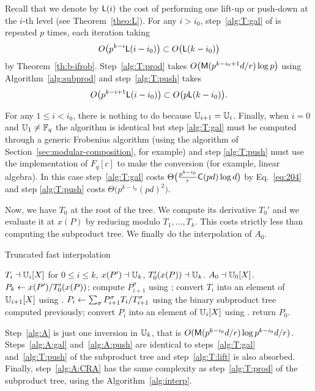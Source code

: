 Recall that we denote by $\mathsf{L}(i)$ the cost of performing one lift-up
or push-down at the $i$-th level (see Theorem~\ref{theo:L}). For any
$i>i_0$, step~\ref{alg:T:gal} of is repeated $p$ times, each iteration
taking 
\[O\bigl(p^{k-i}\mathsf{L}(i-i_0)\bigr) \subset O\bigl(\mathsf{L}(k-i_0)\bigr)\]
by Theorem~\ref{th:b-ifrob}.  Step~\ref{alg:T:prod} takes
$O\bigl(\mathsf{M}(p^{k-i_0+1}d/r)\log p\bigr)$ using
Algorithm~\ref{alg:subprod} and step~\ref{alg:T:push} takes
\[O\bigl(p^{k-i+1}\mathsf{L}(i-i_0)\bigr) \subset
O\bigl(p\mathsf{L}(k-i_0)\bigr)\text{.}\]

For any $1\le i<i_0$, there is nothing to do because
$\mathbb{U}_{i+1}=\mathbb{U}_i$. Finally, when $i=0$ and $\mathbb{U}_1\ne\mathbb{F}_q$ the algorithm
is identical but step \ref{alg:T:gal} must be computed through a
generic Frobenius algorithm (using the algorithm of
Section~\ref{sec:modular-composition}, for example) and step
\ref{alg:T:push} must use the implementation of $F_q[c]$ to make the
conversion (for example, linear algebra). In this case
step~\ref{alg:T:gal} costs
$\Theta\bigl(\frac{p^{k-i_0}}{r}\mathsf{C}(pd)\log d \bigr)$
by Eq.~\eqref{eq:204} and step \ref{alg:T:push} costs
$\Theta\bigl(p^{k-i_0}(pd)^2\bigr)$.

Now, we have $T_0$ at the root of the tree. We compute its derivative
$T_0'$ and we evaluate it at $x(P)$ by reducing modulo
$T_1,\ldots,T_k$. This costs strictly less than computing the
subproduct tree.  We finally do the interpolation of $A_0$.

\begin{algorithm}
  \caption{Truncated fast interpolation}
  \begin{algorithmic}[1]
    \REQUIRE $T_i\dashv\mathbb{U}_i[X]$ for $0\le i\le k$, $x(P')\dashv\mathbb{U}_k$, $T_0'(x(P))\dashv\mathbb{U}_k$.
    \ENSURE $A_0\dashv\mathbb{U}_0[X]$.
    \STATE\label{alg:A}  $P_k \leftarrow x(P')/T_0'(x(P))$;
    \STATE\label{alg:A:gal} compute $P_{i+1}^\sigma$ using ;
    \ENDFOR
    \STATE\label{alg:T:lift} convert $T_i$ into an element of $\mathbb{U}_{i+1}[X]$ using .
    \STATE\label{alg:A:CRA} $P_i\leftarrow \sum_{\sigma}P_{i+1}^\sigma T_i/T_{i+1}^\sigma$ using the binary subproduct tree computed previously;
    \STATE\label{alg:A:push} convert  $P_i$ into an element of
    $\mathbb{U}_i[X]$ using .
    \ENDFOR
    \STATE return $P_0$.
  \end{algorithmic}
\end{algorithm}

Step~\ref{alg:A} is just one inversion in $\mathbb{U}_k$, that is
$O(\mathsf{M}(p^{k-i_0}d/r)\log p^{k-i_0}d/r)$. Steps~\ref{alg:A:gal}
and~\ref{alg:A:push} are identical to steps~\ref{alg:T:gal}
and~\ref{alg:T:push} of the subproduct tree and step~\ref{alg:T:lift}
is also absorbed. Finally, step~\ref{alg:A:CRA} has the same
complexity as step~\ref{alg:T:prod} of the subproduct tree, using the
Algorithm~\ref{alg:interp}.

